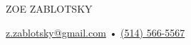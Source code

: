\fontsize{15mm}{16mm}\selectfont
\color{highlightcolor}
ZOE ZABLOTSKY

\fontsize{3.75mm}{4mm}\selectfont
\color{black}
\href{mailto:z.zablotsky@gmail.com}{z.zablotsky@gmail.com} • \href{tel:+514-566-5567}{(514) 566-5567}
\par
